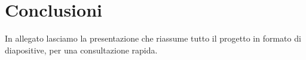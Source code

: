 \section{Conclusioni}

In allegato lasciamo la presentazione \cite{platooning_presentation} che riassume tutto il progetto in formato di diapositive, per una consultazione rapida.